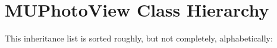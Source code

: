 \section{MUPhoto\-View Class Hierarchy}
This inheritance list is sorted roughly, but not completely, alphabetically:\begin{CompactList}
\item {}
\item {}
\end{CompactList}
